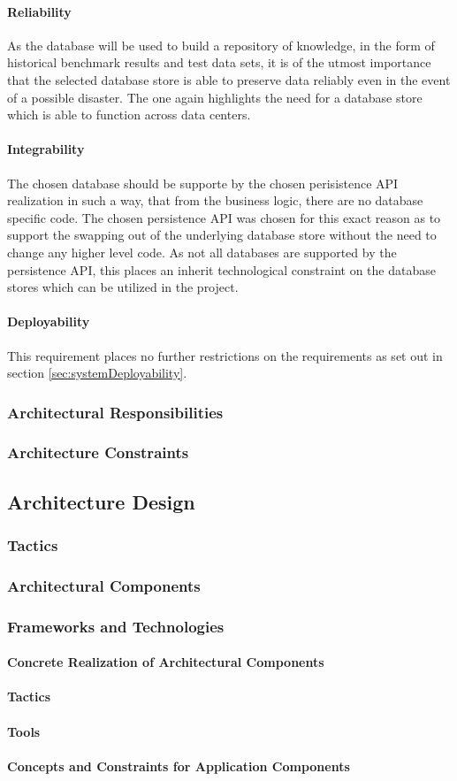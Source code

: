 \paragraph{Reliability}
As the database will be used to build a repository of knowledge, in the form of
historical benchmark results and test data sets, it is of the utmost importance
that the selected database store is able to preserve data reliably even in the
event of a possible disaster. The one again highlights the need for a database
store which is able to function across data centers.

\paragraph{Integrability}
The chosen database should be supporte by the chosen perisistence API realization
in such a way, that from the business logic, there are no database specific
code. The chosen persistence API was chosen for this exact reason as to support
the swapping out of the underlying database store without the need to change any
higher level code. As not all databases are supported by the persistence API,
this places an inherit technological constraint on the database stores which can
be utilized in the project.

\paragraph{Deployability}
This requirement places no further restrictions on the requirements as set out
in section \ref{sec:systemDeployability}.

\subsubsection{Architectural Responsibilities}
\subsubsection{Architecture Constraints}
\subsection{Architecture Design}
\subsubsection{Tactics}
\subsubsection{Architectural Components}
\subsubsection{Frameworks and Technologies}
\paragraph{Concrete Realization of Architectural Components}
\paragraph{Tactics}
\paragraph{Tools}
\paragraph{Concepts and Constraints for Application Components}